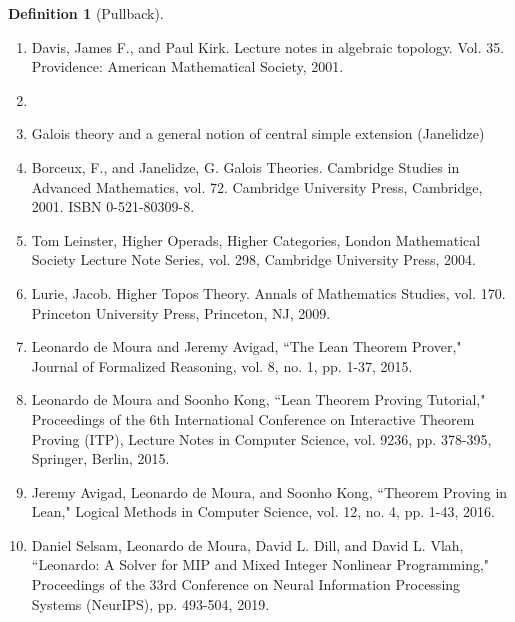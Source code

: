 \documentclass{book}
\theoremstyle{definition}
\newtheorem{definition}{Definition}
\begin{document}
\begin{definition}[Pullback]

\begin{enumerate}
\item Davis, James F., and Paul Kirk. Lecture notes in algebraic topology. Vol. 35. Providence: American Mathematical Society, 2001.
\item 
\item Galois theory and a general notion of central simple extension (Janelidze) 
\item Borceux, F., and Janelidze, G. Galois Theories. Cambridge Studies in Advanced Mathematics, vol. 72. Cambridge University Press, Cambridge, 2001. ISBN 0-521-80309-8.
\item Tom Leinster, Higher Operads, Higher Categories, London Mathematical Society Lecture Note Series, vol. 298, Cambridge University Press, 2004.
\item Lurie, Jacob. Higher Topos Theory. Annals of Mathematics Studies, vol. 170. Princeton University Press, Princeton, NJ, 2009.
\item Leonardo de Moura and Jeremy Avigad, ``The Lean Theorem Prover," Journal of Formalized Reasoning, vol. 8, no. 1, pp. 1-37, 2015.
\item Leonardo de Moura and Soonho Kong, ``Lean Theorem Proving Tutorial," Proceedings of the 6th International Conference on Interactive Theorem Proving (ITP), Lecture Notes in Computer Science, vol. 9236, pp. 378-395, Springer, Berlin, 2015.
\item Jeremy Avigad, Leonardo de Moura, and Soonho Kong, ``Theorem Proving in Lean," Logical Methods in Computer Science, vol. 12, no. 4, pp. 1-43, 2016.
\item Daniel Selsam, Leonardo de Moura, David L. Dill, and David L. Vlah, ``Leonardo: A Solver for MIP and Mixed Integer Nonlinear Programming," Proceedings of the 33rd Conference on Neural Information Processing Systems (NeurIPS), pp. 493-504, 2019.

\end{enumerate}
\end{definition}
\end{document}
